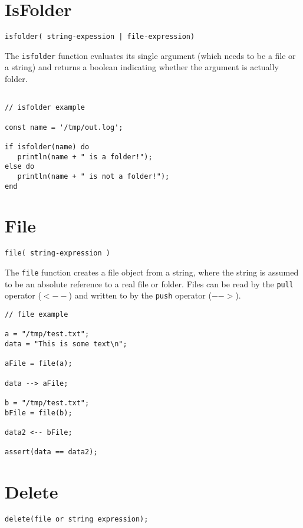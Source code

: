 \section{IsFolder}

\begin{Verbatim}
isfolder( string-expession | file-expression)
\end{Verbatim}

The \Verb+isfolder+ function evaluates its single argument (which needs to be a file or a string) and returns a boolean indicating whether the argument is actually  folder.

\begin{lstlisting}[caption={IsFolder example}]

// isfolder example

const name = '/tmp/out.log';

if isfolder(name) do
   println(name + " is a folder!");
else do
   println(name + " is not a folder!");
end

\end{lstlisting}

\section{File}
\begin{Verbatim}
file( string-expression )
\end{Verbatim}

The \Verb+file+ function creates a \Reflex file object from a string, where the string is assumed to be an absolute reference to a real file or folder. Files can be read by the \verb+pull+ operator ($<--$) and written to by the \verb+push+ operator ($-->$).

\begin{lstlisting}[caption={File example}]
// file example

a = "/tmp/test.txt";
data = "This is some text\n";

aFile = file(a);

data --> aFile;

b = "/tmp/test.txt";
bFile = file(b);

data2 <-- bFile;

assert(data == data2);
\end{lstlisting}

\section{Delete}
\begin{Verbatim}
delete(file or string expression);
\end{Verbatim}

